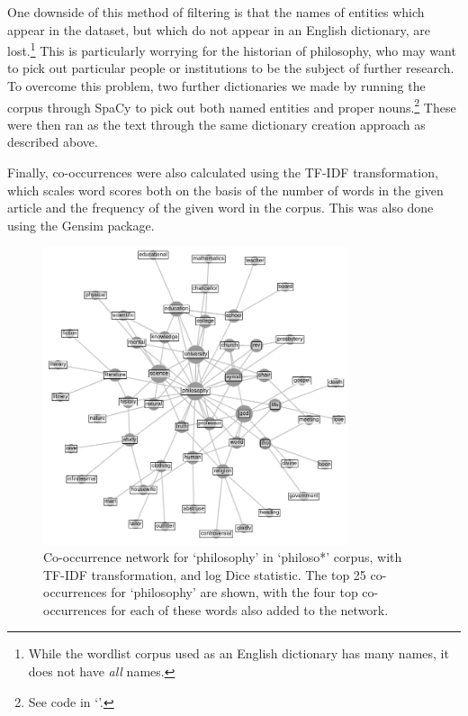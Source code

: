 \documentclass{article}
\begin{document}
One downside of this method of filtering is that the names of entities which appear in the dataset, but which do not appear in an English dictionary, are lost.\footnote{While the wordlist corpus used as an English dictionary has many names, it does not have \emph{all} names.} This is particularly worrying for the historian of philosophy, who may want to pick out particular people or institutions to be the subject of further research. To overcome this problem, two further dictionaries we made by  running the corpus through SpaCy \cite{spacy} to pick out both named entities and proper nouns.\footnote{See code in `'.} These were then ran as the text through the same dictionary creation approach as described above.

Finally, co-occurrences were also calculated using the TF-IDF transformation, which scales word scores both on the basis of the number of words in the given article and the frequency of the given word in the corpus. This was also done using the Gensim package.

\begin{figure}
    \centering
    \includegraphics[width=0.8\textwidth]{images/philo_cooccurrence.png}
    \caption{Co-occurrence network for `philosophy' in `philoso*' corpus, with TF-IDF transformation, and log Dice statistic. The top 25 co-occurrences for `philosophy' are shown, with the four top co-occurrences for each of these words also added to the network.}
    \label{f:cooccurrence}
\end{figure}
\end{document}
